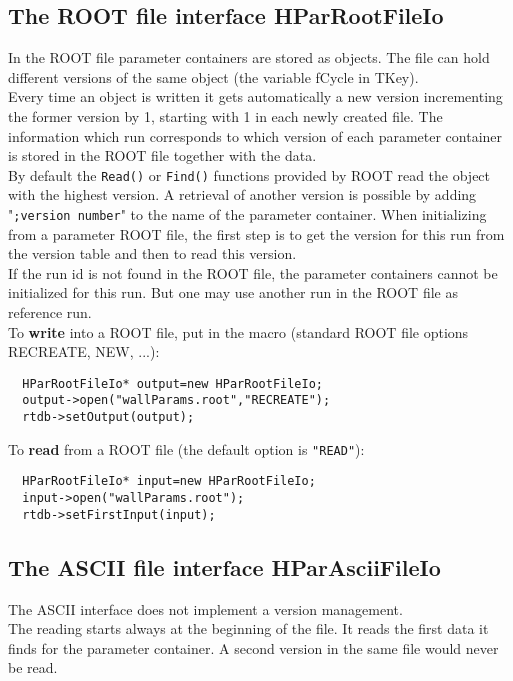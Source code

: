 \subsection[The ROOT file interface HParRootFileIo]{The ROOT file interface HParRootFileIo} \label{sec:rtdbHParRootFileIo}

In the ROOT file parameter containers are stored as objects. The file can hold different versions of the same object 
(the variable fCycle in TKey).\\
Every time an object is written it gets automatically a new version incrementing the former version by 1, starting with 1 
in each newly created file. The information which run corresponds to which version of each parameter container is stored 
in the ROOT file together with the data.\\
By default the \verb+Read()+ or \verb+Find()+ functions provided by ROOT read the object with the highest version. A retrieval of 
another version is possible by adding "\verb+;version number+" to the name of the parameter container. When initializing from 
a parameter ROOT file, the first step is to get the version for this run from the version table and then to read this 
version.\\
If the run id is not found in the ROOT file, the parameter containers cannot be initialized for this run. But one may use 
another run in the ROOT file as reference run.\\

To \textbf{write} into a ROOT file, put in the macro (standard ROOT file options RECREATE, NEW, ...):
\begin{lstlisting}
  HParRootFileIo* output=new HParRootFileIo;
  output->open("wallParams.root","RECREATE");
  rtdb->setOutput(output);
\end{lstlisting}

To \textbf{read} from a ROOT file (the default option is \verb+"READ"+):
\begin{lstlisting}
  HParRootFileIo* input=new HParRootFileIo;
  input->open("wallParams.root");
  rtdb->setFirstInput(input);
\end{lstlisting}


\subsection[The ASCII file interface HParAsciiFileIo]{The ASCII file interface HParAsciiFileIo} \label{sec:rtdbHParAsciiFileIo}
The ASCII interface does not implement a version management.\\
The reading starts always at the beginning of the file. It reads the first data it finds for the parameter container. A second 
version in the same file would never be read.\\

